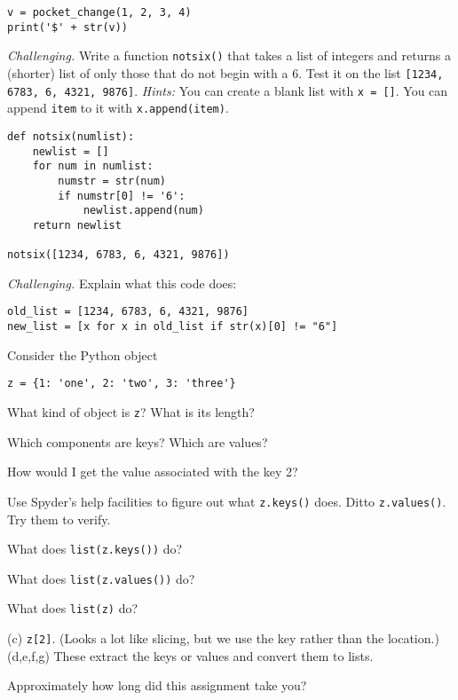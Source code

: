\documentclass[11pt]{exam}
\begin{document}
\begin{questions}
\begin{solution}
\begin{verbatim}
v = pocket_change(1, 2, 3, 4)
print('$' + str(v))
\end{verbatim}
\end{solution}


\item {\it Challenging.\/}
Write a function {\tt notsix()} that takes a list of integers
and returns a (shorter) list of only those that do not begin with a 6.
Test it on the list {\tt [1234, 6783, 6, 4321, 9876]}.
{\it Hints:}  You can create a blank list with {\tt x = []}.
You can append  {\tt item} to it with {\tt x.append(item)}.

\begin{solution}
\begin{verbatim}
def notsix(numlist):
    newlist = []
    for num in numlist:
        numstr = str(num)
        if numstr[0] != '6':
            newlist.append(num)
    return newlist

notsix([1234, 6783, 6, 4321, 9876])
\end{verbatim}
\end{solution}


\item {\it Challenging.\/}
 Explain what this code does:
\begin{verbatim}
old_list = [1234, 6783, 6, 4321, 9876]
new_list = [x for x in old_list if str(x)[0] != "6"]
\end{verbatim}

\item Consider the Python object
\begin{verbatim}
z = {1: 'one', 2: 'two', 3: 'three'}
\end{verbatim}
\begin{parts}
\item What kind of object is {\tt z}?  What is its length?
\item Which components are keys?  Which are values?
\item How would I get the value associated with the key 2?
\item Use Spyder's help facilities to figure out what {\tt z.keys()} does.
Ditto {\tt z.values()}.  Try them to verify.
\item What does {\tt list(z.keys())} do?
\item What does {\tt list(z.values())} do?
\item What does {\tt list(z)} do?
\end{parts}

\begin{solution}
(c) \verb|z[2]|.  (Looks a lot like slicing, but we use the key rather than the location.)
(d,e,f,g) These extract the keys or values and convert them to lists.
\end{solution}


\item Approximately how long did this assignment take you?

\end{questions}


\end{document}
